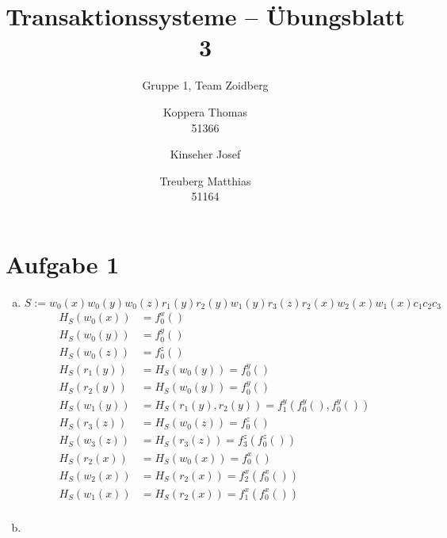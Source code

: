 \documentclass{scrartcl}
\title{Transaktionssysteme -- Übungsblatt 3}
\subtitle{Gruppe 1, Team Zoidberg}
\author{Koppera Thomas \\ 51366
 \and Kinseher Josef \\ 
 \and Treuberg Matthias \\ 51164}
\date{ }
\begin{document}
  \maketitle
  
\section*{Aufgabe 1}
\begin{enumerate}[a)]
\item
$S := w_0(x)w_0(y)w_0(z)r_1(y)r_2(y)w_1(y)r_3(z)r_2(x)w_2(x)w_1(x)c_1 c_2 c_3$
\begin{align*}
H_S(w_0(x)) &= f_0^x()\\
H_S(w_0(y)) &= f_0^y()\\
H_S(w_0(z)) &= f_0^z()\\
H_S(r_1(y)) &= H_S(w_0(y)) = f_0^y()\\
H_S(r_2(y)) &= H_S(w_0(y)) = f_0^y()\\
H_S(w_1(y)) &= H_S(r_1(y),r_2(y)) = f_1^y(f_0^y(),f_0^y())\\
H_S(r_3(z)) &= H_S(w_0(z)) = f_0^z()\\
H_S(w_3(z)) &= H_S(r_3(z)) = f_3^z(f_0^z())\\
H_S(r_2(x)) &= H_S(w_0(x)) = f_0^x()\\
H_S(w_2(x)) &= H_S(r_2(x)) = f_2^x(f_0^x())\\
H_S(w_1(x)) &= H_S(r_2(x)) = f_1^x(f_0^x())\\
\end{align*}
\item
\end{enumerate}
\end{document}
